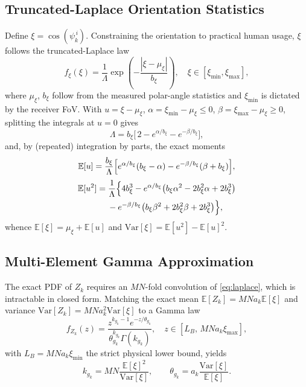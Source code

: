 \documentclass[conference]{IEEEtran}
\newcommand{\E}{\mathbb{E}}
\begin{document}
\subsection{Truncated-Laplace Orientation Statistics}
Define $\xi=\cos(\psi_k^{\,i})$. Constraining the orientation to practical
human usage, $\xi$ follows the truncated-Laplace law
\begin{equation}
f_{\xi}(\xi) = \frac{1}{\Lambda}\exp\!\left(-\frac{|\xi-\mu_\xi|}{b_\xi}\right),
\quad \xi\in[\xi_{\min},\xi_{\max}],
\label{eq:laplace}
\end{equation}
where $\mu_\xi$, $b_\xi$ follow from the measured polar-angle statistics
\cite{soltani2018} and $\xi_{\min}$ is dictated by the receiver FoV. With
$u=\xi-\mu_\xi$, $\alpha=\xi_{\min}-\mu_\xi\le 0$,
$\beta=\xi_{\max}-\mu_\xi\ge 0$, splitting the integrals at $u=0$ gives
\begin{equation}
\Lambda = b_\xi\bigl[\,2 - e^{\alpha/b_\xi} - e^{-\beta/b_\xi}\bigr],
\end{equation}
and, by (repeated) integration by parts, the exact moments
\begin{equation}
\E[u] = \frac{b_\xi}{\Lambda}\Bigl[e^{\alpha/b_\xi}(b_\xi-\alpha)
-e^{-\beta/b_\xi}(\beta+b_\xi)\Bigr],
\label{eq:moment1}
\end{equation}
\begin{equation}
\begin{aligned}
\E[u^2] &= \frac{1}{\Lambda}\Bigl\{4b_\xi^3
- e^{\alpha/b_\xi}\bigl(b_\xi\alpha^2-2b_\xi^2\alpha+2b_\xi^3\bigr)\\
&\quad\; - e^{-\beta/b_\xi}\bigl(b_\xi\beta^2+2b_\xi^2\beta+2b_\xi^3\bigr)
\Bigr\},
\end{aligned}
\label{eq:moment2}
\end{equation}
whence $\E[\xi]=\mu_\xi+\E[u]$ and
$\mathrm{Var}[\xi]=\E[u^2]-\E[u]^2$.

\subsection{Multi-Element Gamma Approximation}
The exact PDF of $Z_k$ requires an $MN$-fold convolution of
\eqref{eq:laplace}, which is intractable in closed form. Matching the exact
mean $\E[Z_k]=MNa_k\E[\xi]$ and variance
$\mathrm{Var}[Z_k]=MNa_k^2\mathrm{Var}[\xi]$ to a Gamma law
\begin{equation}
f_{Z_{k}}(z) = \frac{z^{k_{g_k}-1}e^{-z/\theta_{g_k}}}
{\theta_{g_k}^{k_{g_k}}\Gamma(k_{g_k})},
\quad z \in [L_B,\, MNa_k\xi_{\max}],
\label{eq:gamma}
\end{equation}
with $L_B = MNa_k\xi_{\min}$ the strict physical lower bound, yields
\begin{equation}
k_{g_k} = MN\frac{\E[\xi]^2}{\mathrm{Var}[\xi]}, \qquad
\theta_{g_k} = a_k\frac{\mathrm{Var}[\xi]}{\E[\xi]}.
\label{eq:matching}
\end{equation}
\end{document}

